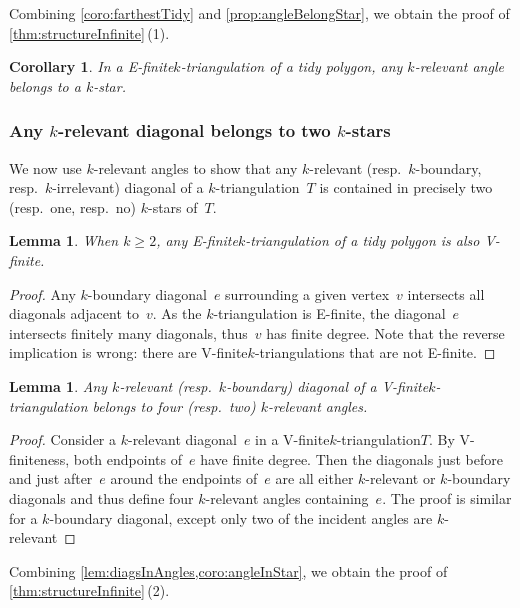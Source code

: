 \documentclass{amsart}
\newtheorem{lemma}[theorem]{Lemma}
\newtheorem{corollary}[theorem]{Corollary}
\theoremstyle{remark}
\newcommand*{\ef}[0]{E-finite\xspace}
\newcommand*{\vf}[0]{V-finite\xspace}
\newcommand*{\ktg}[0]{$k$-triangulation\xspace}
\begin{document}
Combining \cref{coro:farthestTidy} and \cref{prop:angleBelongStar}, we obtain the proof of \cref{thm:structureInfinite}\,(1).

\begin{corollary}
\label{coro:angleInStar}
In a \ef \ktg of a tidy polygon, any $k$-relevant angle belongs to a $k$-star.
\end{corollary}


\subsubsection{Any $k$-relevant diagonal belongs to two $k$-stars}

We now use $k$-relevant angles to show that any $k$-relevant (resp.~$k$-boundary, resp.~$k$-irrelevant) diagonal of a $k$-triangulation~$T$ is contained in precisely two (resp.~one, resp.~no) $k$-stars of~$T$.

\begin{lemma}
When $k \ge 2$, any \ef \ktg of a tidy polygon is also \vf.
\end{lemma}

\begin{proof}
Any $k$-boundary diagonal~$e$ surrounding a given vertex~$v$ intersects all diagonals adjacent to~$v$.
As the $k$-triangulation is \ef, the diagonal~$e$ intersects finitely many diagonals, thus~$v$ has finite degree.
Note that the reverse implication is wrong: there are \vf $k$-triangulations that are not \ef.
\end{proof}

\begin{lemma}
\label{lem:diagsInAngles}
Any $k$-relevant (resp.~$k$-boundary) diagonal of a \vf \ktg belongs to four (resp.~two) $k$-relevant angles.
\end{lemma}

\begin{proof}
Consider a $k$-relevant diagonal~$e$ in a \vf \ktg $T$.
By \vf{}ness, both endpoints of~$e$ have finite degree.
Then the diagonals just before and just after~$e$ around the endpoints of~$e$ are all either $k$-relevant or $k$-boundary diagonals and thus define four $k$-relevant angles containing~$e$.
The proof is similar for a $k$-boundary diagonal, except only two of the incident angles are $k$-relevant
\end{proof}

Combining \cref{lem:diagsInAngles,coro:angleInStar}, we obtain the proof of \cref{thm:structureInfinite}\,(2).
\end{document}
